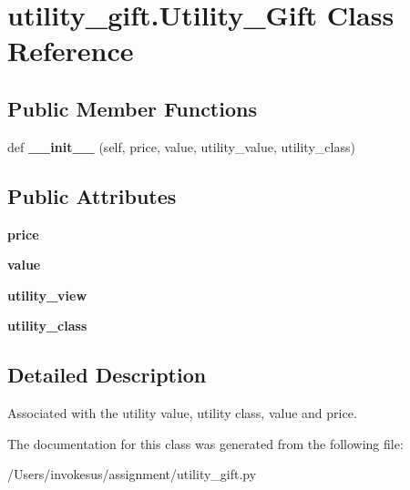 \hypertarget{classutility__gift_1_1_utility___gift}{}\section{utility\+\_\+gift.\+Utility\+\_\+\+Gift Class Reference}
\label{classutility__gift_1_1_utility___gift}
\subsection*{Public Member Functions}
\begin{DoxyCompactItemize}
\item 
\mbox{\label{classutility__gift_1_1_utility___gift_aa052e2d051b6ed87c8a1063994c6d625}} 
def {\bfseries \+\_\+\+\_\+init\+\_\+\+\_\+} (self, price, value, utility\+\_\+value, utility\+\_\+class)
\end{DoxyCompactItemize}
\subsection*{Public Attributes}
\begin{DoxyCompactItemize}
\item 
\mbox{\label{classutility__gift_1_1_utility___gift_a07cbe189b2d18ea5be913c1504494876}} 
{\bfseries price}
\item 
\mbox{\label{classutility__gift_1_1_utility___gift_ad6bfd57dd19981207c362567a99257f1}} 
{\bfseries value}
\item 
\mbox{\label{classutility__gift_1_1_utility___gift_a4e6bdcfbda7e752922e9e5a9a5589aeb}} 
{\bfseries utility\+\_\+view}
\item 
\mbox{\label{classutility__gift_1_1_utility___gift_a7e3112caebf026d3e0c583504e1f5a5c}} 
{\bfseries utility\+\_\+class}
\end{DoxyCompactItemize}


\subsection{Detailed Description}
\begin{DoxyVerb}Associated with the utility value, utility class, value and price. 
\end{DoxyVerb}
 

The documentation for this class was generated from the following file\+:\begin{DoxyCompactItemize}
\item 
/\+Users/invokesus/assignment/utility\+\_\+gift.\+py\end{DoxyCompactItemize}
